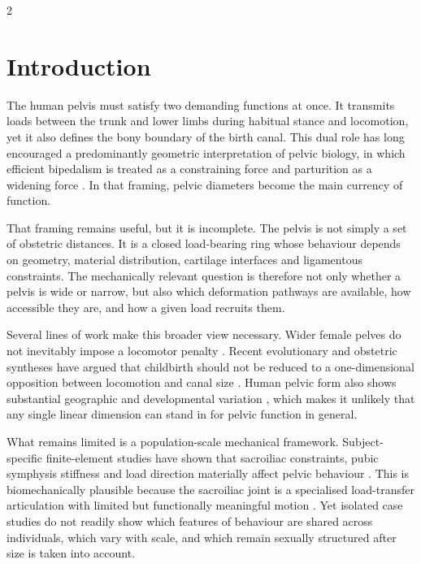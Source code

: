\documentclass[openacc]{rsproca_new}
\begin{document}
\maketitle

\begin{multicols}{2}

\section{Introduction}

The human pelvis must satisfy two demanding functions at once. It transmits loads between the trunk and lower limbs during habitual stance and locomotion, yet it also defines the bony boundary of the birth canal. This dual role has long encouraged a predominantly geometric interpretation of pelvic biology, in which efficient bipedalism is treated as a constraining force and parturition as a widening force \cite{rosenberg2002,trevathan2015,grunstra2023}. In that framing, pelvic diameters become the main currency of function.

That framing remains useful, but it is incomplete. The pelvis is not simply a set of obstetric distances. It is a closed load-bearing ring whose behaviour depends on geometry, material distribution, cartilage interfaces and ligamentous constraints. The mechanically relevant question is therefore not only whether a pelvis is wide or narrow, but also which deformation pathways are available, how accessible they are, and how a given load recruits them.

Several lines of work make this broader view necessary. Wider female pelves do not inevitably impose a locomotor penalty \cite{warrener2015}. Recent evolutionary and obstetric syntheses have argued that childbirth should not be reduced to a one-dimensional opposition between locomotion and canal size \cite{grunstra2023,pavlicev2020}. Human pelvic form also shows substantial geographic and developmental variation \cite{betti2018,verbruggen2017,novak2020}, which makes it unlikely that any single linear dimension can stand in for pelvic function in general.

What remains limited is a population-scale mechanical framework. Subject-specific finite-element studies have shown that sacroiliac constraints, pubic symphysis stiffness and load direction materially affect pelvic behaviour \cite{eichenseer2011,hammer2013}. This is biomechanically plausible because the sacroiliac joint is a specialised load-transfer articulation with limited but functionally meaningful motion \cite{vleeming2012}. Yet isolated case studies do not readily show which features of behaviour are shared across individuals, which vary with scale, and which remain sexually structured after size is taken into account.


\end{multicols}
\end{document}
